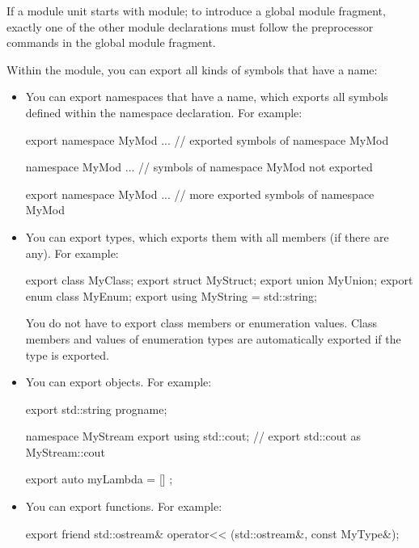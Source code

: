 If a module unit starts with module; to introduce a global module fragment, exactly one of the other module declarations must follow the preprocessor commands in the global module fragment.

Within the module, you can export all kinds of symbols that have a name:

\begin{itemize}
\item 
You can export namespaces that have a name, which exports all symbols defined within the namespace declaration. For example:

\begin{cpp}
export namespace MyMod {
	... // exported symbols of namespace MyMod
}

namespace MyMod {
	... // symbols of namespace MyMod not exported
}

export namespace MyMod {
	... // more exported symbols of namespace MyMod
}
\end{cpp}


\item 
You can export types, which exports them with all members (if there are any). For example:

\begin{cpp}
export class MyClass;
export struct MyStruct;
export union MyUnion;
export enum class MyEnum;
export using MyString = std::string;
\end{cpp}

You do not have to export class members or enumeration values. Class members and values of enumeration types are automatically exported if the type is exported.

\item 
You can export objects. For example:

\begin{cpp}
export std::string progname;

namespace MyStream {
	export using std::cout; // export std::cout as MyStream::cout
}

export auto myLambda = [] {};
\end{cpp}

\item 
You can export functions. For example:

\begin{cpp}
export friend std::ostream& operator<< (std::ostream&, const MyType&);
\end{cpp}
\end{itemize}

